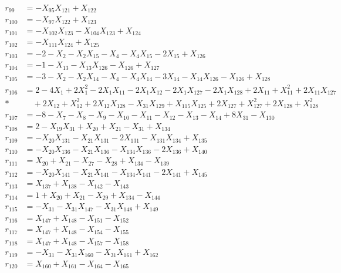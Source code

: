 \begin{align*}
r_{99} &= -X_{95}X_{121} + X_{122} \\[3pt]
r_{100} &= -X_{97}X_{122} + X_{123} \\[3pt]
r_{101} &= -X_{102}X_{123} - X_{104}X_{123} + X_{124} \\[3pt]
r_{102} &= -X_{111}X_{124} + X_{125} \\[3pt]
r_{103} &= -2 - X_{2} - X_{2}X_{15} - X_{4} - X_{4}X_{15} - 2X_{15} + X_{126} \\[3pt]
r_{104} &= -1 - X_{13} - X_{13}X_{126} - X_{126} + X_{127} \\[3pt]
r_{105} &= -3 - X_{2} - X_{2}X_{14} - X_{4} - X_{4}X_{14} - 3X_{14} - X_{14}X_{126} - X_{126} + X_{128} \\[3pt]
r_{106} &= 2 - 4X_{1} + 2X_{1}^{2} - 2X_{1}X_{11} - 2X_{1}X_{12} - 2X_{1}X_{127} - 2X_{1}X_{128} + 2X_{11} + X_{11}^{2} + 2X_{11}X_{127} \\*
&\quad  + 2X_{12} + X_{12}^{2} + 2X_{12}X_{128} - X_{31}X_{129} + X_{115}X_{125} + 2X_{127} + X_{127}^{2} + 2X_{128} + X_{128}^{2} \\[3pt]
r_{107} &= -8 - X_{7} - X_{8} - X_{9} - X_{10} - X_{11} - X_{12} - X_{13} - X_{14} + 8X_{31} - X_{130} \\[3pt]
r_{108} &= 2 - X_{19}X_{31} + X_{20} + X_{21} - X_{31} + X_{134} \\[3pt]
r_{109} &= -X_{20}X_{131} - X_{21}X_{131} - 2X_{131} - X_{131}X_{134} + X_{135} \\[3pt]
r_{110} &= -X_{20}X_{136} - X_{21}X_{136} - X_{134}X_{136} - 2X_{136} + X_{140} \\[3pt]
r_{111} &= X_{20} + X_{21} - X_{27} - X_{28} + X_{134} - X_{139} \\[3pt]
r_{112} &= -X_{20}X_{141} - X_{21}X_{141} - X_{134}X_{141} - 2X_{141} + X_{145} \\[3pt]
r_{113} &= X_{137} + X_{138} - X_{142} - X_{143} \\[3pt]
r_{114} &= 1 + X_{20} + X_{21} - X_{29} + X_{134} - X_{144} \\[3pt]
r_{115} &= -X_{31} - X_{31}X_{147} - X_{31}X_{148} + X_{149} \\[3pt]
r_{116} &= X_{147} + X_{148} - X_{151} - X_{152} \\[3pt]
r_{117} &= X_{147} + X_{148} - X_{154} - X_{155} \\[3pt]
r_{118} &= X_{147} + X_{148} - X_{157} - X_{158} \\[3pt]
r_{119} &= -X_{31} - X_{31}X_{160} - X_{31}X_{161} + X_{162} \\[3pt]
r_{120} &= X_{160} + X_{161} - X_{164} - X_{165} \\[3pt]

\end{align*}
